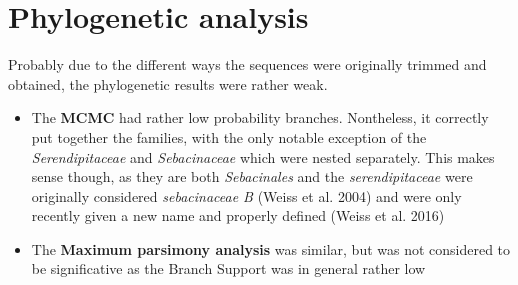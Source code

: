 \section{Phylogenetic analysis}
\label{phylogeneticanalysis}

Probably due to the different ways the sequences were originally trimmed and obtained, the phylogenetic results were rather weak.

\begin{itemize}
\item The \textbf{MCMC} had rather low probability branches. Nontheless, it correctly put together the families, with the only notable exception of the \emph{Serendipitaceae} and \emph{Sebacinaceae} which were nested separately. This makes sense though, as they are both \emph{Sebacinales} and the \emph{serendipitaceae} were originally considered \emph{sebacinaceae B} (Weiss et al. 2004) and were only recently given a new name and properly defined (Weiss et al. 2016)

\item The \textbf{Maximum parsimony analysis} was similar, but was not considered to be significative as the Branch Support was in general rather low

\end{itemize}




